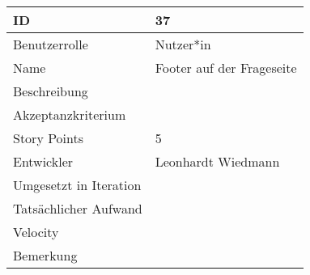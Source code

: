 \begin{tabularx}{\textwidth}{|p{}|X|}
	\hline
	ID & 37\\
	\hline
	Benutzerrolle & Nutzer*in\\
	\hline
	Name & Footer auf der Frageseite\\
	\hline
	Beschreibung & \\
	\hline
	Akzeptanzkriterium & \\
	\hline
	Story Points & 5\\
	\hline
	Entwickler & Leonhardt Wiedmann\\
	\hline
	Umgesetzt in Iteration & \\ 
	\hline
	Tatsächlicher Aufwand & \\
	\hline
	Velocity & \\
	\hline
	Bemerkung & \\
	\hline
\end{tabularx}
\vspace{20pt}
